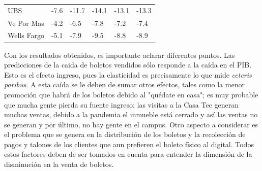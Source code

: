\begin{table}[H]
{\begin{tabular}{l|l|llll}
UBS                              & -7.6                        & -11.7                         & -14.1                        & -13.1                         & -13.3                           \\
Ve Por Mas                       & -4.2                        & -6.5                          & -7.8                         & -7.2                          & -7.4                            \\
Wells Fargo                      & -5.1                        & -7.9                          & -9.5                         & -8.8                          & -8.9                            \\ \hline
\end{tabular}
}
\end{table}

\newpage

Con los resultados obtenidos, es importante aclarar diferentes puntos. Las predicciones de la caida de boletos vendidos sólo responde a la caída en el PIB. Esto es el efecto ingreso, pues la elasticidad es precisamente lo que mide \textit{ceteris paribus}. A esta caída se le deben de sumar otros efectos, tales como la menor promoción que habrá de los boletos debido al "quédate en casa"; es muy probable que mucha gente pierda su fuente ingreso; las visitas a la Casa Tec generan muchas ventas, debido a la pandemia el inmueble está cerrado y así las ventas no se generan y por último, no hay gente en el campus. Otro aspecto a considerar es el problema que se genera en la distribución de los boletos y la recolección de pagos y talones de los clientes que aun prefieren el boleto físico al digital. Todos estos factores deben de ser tomados en cuenta para entender la dimensión de la disminución en la venta de boletos. 